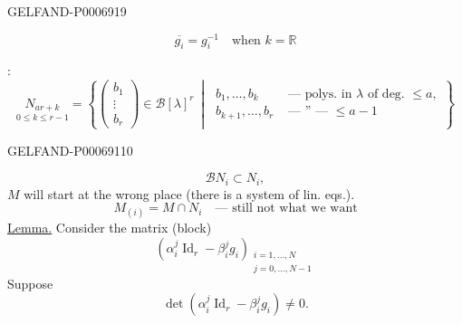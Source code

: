 \begin{GelfandAdjacentEvidence}{GELFAND-P000691}{9}

\[
\overline{g_i}=g_i^{-1}\quad\text{when }k=\mathbb R
\]

:
\[
\underset{0\leq k\leq r-1}{N_{ar+k}}
=\left\{
\begin{pmatrix}b_1\\\vdots\\b_r\end{pmatrix}\in\mathcal B[\lambda]^r
\ \middle|\
\begin{aligned}
b_1,\ldots,b_k&\text{ --- polys. in }\lambda\text{ of deg. }\leq a,\\
b_{k+1},\ldots,b_r&\text{ --- '' --- }\leq a-1
\end{aligned}\right\}
\]
\end{GelfandAdjacentEvidence}
\begin{GelfandAdjacentEvidence}{GELFAND-P000691}{10}

\end{GelfandAdjacentEvidence}

\[
\mathcal B N_i\subset N_i,
\]
\(M\) will start at the wrong place (there is a system of lin. eqs.).
\[
M_{(i)}=M\cap N_i\quad\text{--- still not what we want}
\]
\underline{Lemma.} Consider the matrix (block)
\[
(\alpha_i^j\operatorname{Id}_r-\beta_i^j g_i)_{
\substack{i=1,\ldots,N\\j=0,\ldots,N-1}}
\]
Suppose
\[
\det(\alpha_i^j\operatorname{Id}_r-\beta_i^j g_i)\ne0.
\]


